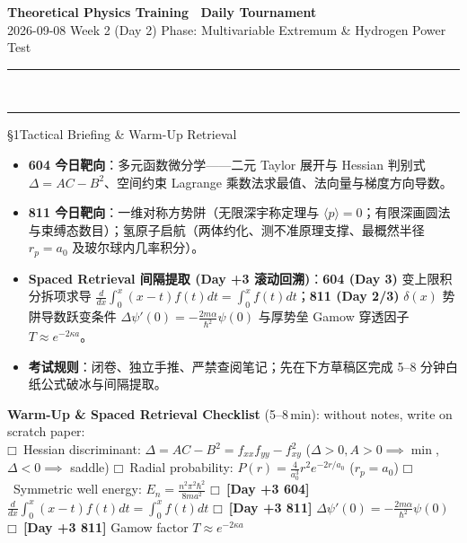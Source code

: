 \documentclass[a4paper,11pt]{article}
\newcommand{\checkbox}{\ensuremath{\mdlgwhtsquare}}
\newcommand{\alerttag}[1]{\textcolor{wine}{\sffamily\bfseries [#1]}}
\begin{document}
\clearpage

\begin{center}
  {\LARGE\bfseries\color{navy} Theoretical Physics Training \textperiodcentered\ Daily Tournament}\\[3pt]
  {\small\sffamily\color{mist} 2026-09-08 \quad\textbar\quad Week 2 (Day 2) \quad\textbar\quad Phase: Multivariable Extremum \& Hydrogen Power Test}\\[-4pt]
  {\color{navy}\rule{\textwidth}{0.8pt}}\\[-11pt]
  {\color{border}\rule{\textwidth}{0.3pt}}
\end{center}

\vspace{-6pt}

\begin{briefing}{\S 1\quad Tactical Briefing \& Warm-Up Retrieval}
\begin{itemize}[leftmargin=1.5em, itemsep=2pt, topsep=1pt]
  \item \textbf{604 今日靶向}：多元函数微分学——二元 Taylor 展开与 Hessian 判别式 $\Delta = AC-B^2$、空间约束 Lagrange 乘数法求最值、法向量与梯度方向导数。
  \item \textbf{811 今日靶向}：一维对称方势阱（无限深宇称定理与 $\langle p \rangle = 0$；有限深画圆法与束缚态数目）；氢原子启航（两体约化、测不准原理支撑、最概然半径 $r_p=a_0$ 及玻尔球内几率积分）。
  \item \textbf{Spaced Retrieval 间隔提取 (Day +3 滚动回溯)}：\textbf{604 (Day 3)} 变上限积分拆项求导 $\frac{d}{dx}\int_0^x (x-t)f(t)dt = \int_0^x f(t)dt$；\textbf{811 (Day 2/3)} $\delta(x)$ 势阱导数跃变条件 $\Delta \psi'(0) = -\frac{2m\alpha}{\hbar^2}\psi(0)$ 与厚势垒 Gamow 穿透因子 $T\approx e^{-2\kappa a}$。
  \item \textbf{考试规则}：闭卷、独立手推、严禁查阅笔记；先在下方草稿区完成 5--8 分钟白纸公式破冰与间隔提取。
\end{itemize}

\vspace{1mm}
\textbf{Warm-Up \& Spaced Retrieval Checklist} (5--8\,min): without notes, write on scratch paper:\\
\checkbox\ Hessian discriminant: $\Delta = AC - B^2 = f_{xx}f_{yy} - f_{xy}^2$ ($\Delta>0, A>0 \implies \min$, $\Delta<0 \implies$ saddle) \quad
\checkbox\ Radial probability: $P(r) = \frac{4}{a_0^3}r^2 e^{-2r/a_0}$ ($r_p = a_0$) \quad
\checkbox\ Symmetric well energy: $E_n = \frac{n^2\pi^2\hbar^2}{8ma^2}$ \quad
\checkbox\ \alerttag{Day +3 604} $\frac{d}{dx}\int_0^x (x-t)f(t)dt = \int_0^x f(t)dt$ \quad
\checkbox\ \alerttag{Day +3 811} $\Delta \psi'(0) = -\frac{2m\alpha}{\hbar^2}\psi(0)$ \quad
\checkbox\ \alerttag{Day +3 811} Gamow factor $T \approx e^{-2\kappa a}$
\end{briefing}
\end{document}
